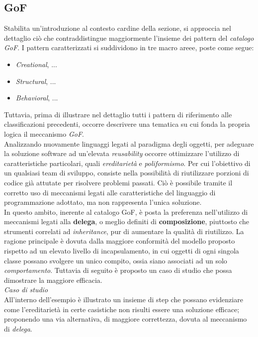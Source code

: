 \documentclass{article}
\begin{document}
\subsection*{GoF}
\large
Stabilita un'introduzione al contesto cardine della sezione, si approccia nel dettaglio ciò che contraddistingue maggiormente l'insieme dei pattern del \textit{catalogo GoF}. I pattern caratterizzati si suddividono in tre macro areee, poste come segue:
\begin{itemize}[label={-}]
    \itemsep0em
    \item \textit{Creational}, ...
    \item \textit{Structural}, ... 
    \item \textit{Behavioral}, ... 
\end{itemize} 
Tuttavia, prima di illustrare nel dettaglio tutti i pattern di riferimento alle classificazioni precedenti, occorre descrivere una tematica su cui fonda la propria logica il meccanismo \textit{GoF}.\vspace*{14pt}\\
Analizzando nuovamente linguaggi legati al paradigma degli oggetti, per adeguare la soluzione software ad un'elevata \textit{reusability} occorre ottimizzare l'utilizzo di caratteristiche particolari, quali \textit{ereditarietà} e \textit{poliformismo}. Per cui l'obiettivo di un qualsiasi team di sviluppo, consiste nella possibilità di riutilizzare porzioni di codice già attutate per risolvere problemi passati. Ciò è possibile tramite il corretto uso di meccanismi legati alle caratteristiche del linguaggio di programmazione adottato, ma non rappresenta l'unica soluzione.\vspace*{14pt}\\
In questo ambito, inerente al catalogo GoF, è posta la preferenza nell'utilizzo di meccanismi legati alla \textbf{delega}, o meglio definiti di \textbf{composizione}, piuttosto che strumenti correlati ad \textit{inheritance}, pur di aumentare la qualità di riutilizzo. La ragione principale è dovuta dalla maggiore conformità del modello proposto rispetto ad un elevato livello di incapsulamento, in cui oggetti di ogni singola classe possano svolgere un unico compito, ossia siano associati ad un solo \textit{comportamento}. Tuttavia di seguito è proposto un caso di studio che possa dimostrare la maggiore efficacia.\vspace*{14pt}\\
\textit{Caso di studio}\\
All'interno dell'esempio è illustrato un insieme di step che possano evidenziare come l'ereditarietà in certe casistiche non risulti essere una soluzione efficace; proponendo una via alternativa, di maggiore correttezza, dovuta al meccanismo di \textit{delega}.
\end{document}
